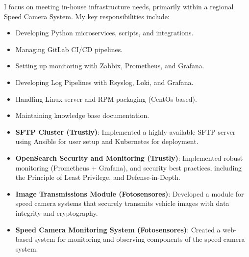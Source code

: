 \documentclass[10pt,a4paper]{altacv}
\begin{document}
\divider


I focus on meeting in-house infrastructure needs, primarily within a regional Speed Camera System. My key responsibilities include:

\bigskip

\begin{itemize}
    \item Developing Python microservices, scripts, and integrations.
    \item Managing GitLab CI/CD pipelines.
    \item Setting up monitoring with Zabbix, Prometheus, and Grafana.
    \item Developing Log Pipelines with Rsyslog, Loki, and Grafana.
    \item Handling Linux server and RPM packaging (CentOs-based).
    \item Maintaining knowledge base documentation.
\end{itemize}


\begin{itemize}
    \item \textbf{SFTP Cluster (Trustly)}: Implemented a highly available SFTP server using Ansible for user setup and Kubernetes for deployment.
    \item \textbf{OpenSearch Security and Monitoring (Trustly)}: Implemented robust monitoring (Prometheus + Grafana), and security best practices, including the Principle of Least Privilege, and Defense-in-Depth.
    \item \textbf{Image Transmissions Module (Fotosensores)}: Developed a module for speed camera systems that securely transmits vehicle images with data integrity and cryptography.
    \item \textbf{Speed Camera Monitoring System (Fotosensores)}: Created a web-based system for monitoring and observing components of the speed camera system.
\end{itemize}

\clearpage
\end{document}
